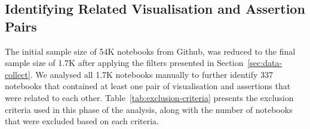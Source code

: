 \documentclass[acmsmall,screen,review,anonymous]{acmart}
\begin{document}
\subsection{Identifying Related Visualisation and Assertion
Pairs}\label{sec:identify-related-pairs}

The initial sample size of 54K notebooks from Github, was reduced to the final sample size of 1.7K after applying the filters presented in Section~\ref{sec:data-collect}. We analysed all 1.7K notebooks manually to further identify 337 notebooks that contained at least one pair of visualisation and assertions that were related to each other. Table~\ref{tab:exclusion-criteria} presents the exclusion criteria used in this phase of the analysis, along with the number of notebooks that were excluded based on each criteria.
\end{document}
